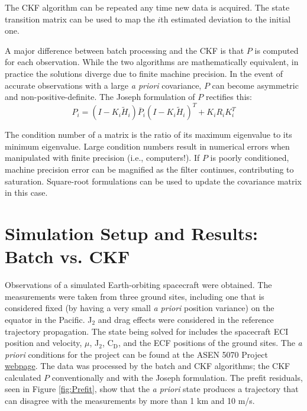 \documentclass[]{aiaa-tc}%
\begin{document}
	\noindent The CKF algorithm can be repeated any time new data is acquired. The state transition matrix can be used to map the $i$th estimated deviation to the initial one. 
	
	\vspace{5 mm}

	A major difference between batch processing and the CKF is that $P$ is computed for each observation.  While the two algorithms are mathematically equivalent, in practice the solutions diverge due to finite machine precision. In the event of accurate observations with a large \textit{a priori} covariance, $P$ can become asymmetric and non-positive-definite.  The Joseph formulation of $P$ rectifies this:
	\begin{equation}
	P_i=(I-K_i\tilde{H}_i)\bar{P}_i(I-K_i\tilde{H}_i)^T+K_iR_iK_i^T
	\end{equation}

	\noindent The condition number of a matrix is the ratio of its maximum eigenvalue to its minimum eigenvalue\cite{Born}.  Large condition numbers result in numerical errors when manipulated with finite precision (i.e., computers!). If $P$ is poorly conditioned, machine precision error can be magnified as the filter continues, contributing to saturation. Square-root formulations can be used to update the covariance matrix in this case.
	
	\section{Simulation Setup and Results: Batch vs. CKF}
	
	Observations of a simulated Earth-orbiting spacecraft were obtained. The measurements were taken from three ground sites, including one that is considered fixed (by having a very small \textit{a priori} position variance) on the equator in the Pacific. J$_{\text{2}}$ and drag effects were considered in the reference trajectory propagation. The state being solved for includes the spacecraft ECI position and velocity, $\mu$, J$_{\text{2}}$, C$_{\text{D}}$, and the ECF positions of the ground sites.  The \textit{a priori} conditions for the project can be found at the ASEN 5070 Project \href{http://ccar.colorado.edu/ASEN5070/odproject/index.html}{webpage}.  The data was processed by the batch and CKF algorithms; the CKF calculated $P$ conventionally and with the Joseph formulation.  The prefit residuals, seen in Figure \ref{fig:Prefit}, show that the \textit{a priori} state produces a trajectory that can disagree with the measurements by more than 1 km and 10 m/s.
	
\end{document}
